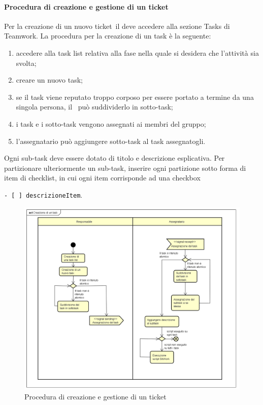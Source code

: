 \documentclass[../NormeProgetto.tex]{subfiles}
\begin{document}
			\paragraph{Procedura di creazione e gestione di un ticket}
				Per la creazione di un nuovo ticket\g\ il \responsabilediprogetto deve accedere alla sezione Tasks di Teamwork\g. La procedura per la creazione di un task è la seguente:
				\begin{enumerate}
					\item accedere alla task list relativa alla fase nella quale si desidera che l'attività sia svolta;
					\item creare un nuovo task;
					\item se il task viene reputato troppo corposo per essere portato a termine da una singola persona, il \responsabilediprogetto\ può suddividerlo in sotto-task;
					\item i task e i sotto-task vengono assegnati ai membri del gruppo;
					\item l'assegnatario può aggiungere sotto-task al task assegnatogli. 
				\end{enumerate}
				Ogni sub-task deve essere dotato di titolo e descrizione esplicativa. Per partizionare ulteriormente un sub-task, inserire ogni partizione sotto forma di item di checklist, in cui ogni item corrisponde ad una checkbox \begin{center}\texttt{- [ ] descrizioneItem}.\end{center}
				\begin{figure}[H]
					\centering
					\includegraphics[scale=0.55]{sections/img/creazioneTask.png}
					\caption{Procedura di creazione e gestione di un ticket}\label{fig:Procedura di creazione e gestione di un ticket - Parte 1} 
				\end{figure}
\end{document}
